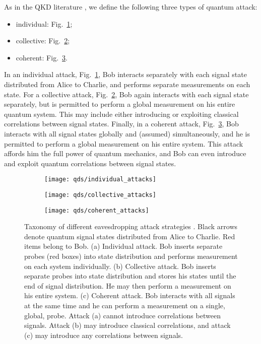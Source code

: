 As in the QKD literature \cite{Lutkenhaus2004}, we define the following three types of quantum attack: 
\begin{itemize}
\item individual: Fig.~\ref{fig:types_of_attack_individual};
\item collective: Fig.~\ref{fig:types_of_attack_collective};
\item coherent: Fig.~\ref{fig:types_of_attack_coherent}.
\end{itemize}
In an individual attack, Fig.~\ref{fig:types_of_attack_individual}, Bob interacts separately with each signal state distributed from Alice to Charlie, and performs separate measurements on each state. For a collective attack, Fig.~\ref{fig:types_of_attack_collective}, Bob again interacts with each signal state separately, but is permitted to perform a global measurement on his entire quantum system. This may include either introducing or exploiting classical correlations between signal states. Finally, in a coherent attack, Fig.~\ref{fig:types_of_attack_coherent}, Bob interacts with all signal states globally and (assumed) simultaneously, and he is permitted to perform a global measurement on his entire system. This attack affords him the full power of quantum mechanics, and Bob can even introduce and exploit quantum correlations between signal states.


\begin{figure}[htp]
\captionsetup{width=0.8\linewidth}
\centering
	\begin{subfigure}{\linewidth}
		\centering
			\caption{\label{fig:types_of_attack_individual}}
		\texttt{[image: qds/individual\_attacks]}
	\end{subfigure}
	\begin{subfigure}{\linewidth}
		\centering
		\caption{\label{fig:types_of_attack_collective}}	
		\texttt{[image: qds/collective\_attacks]}
	\end{subfigure}
	\begin{subfigure}{\linewidth}
		\centering
		\caption{\label{fig:types_of_attack_coherent}}	
		\texttt{[image: qds/coherent\_attacks]}
	\end{subfigure}
\caption{\label{fig:types_of_attack} Taxonomy of different eavesdropping attack strategies \cite{Lutkenhaus2004}. Black arrows denote quantum signal states distributed from Alice to Charlie. Red items belong to Bob. (a) Individual attack. Bob inserts separate probes (red boxes) into state distribution and performs measurement on each system individually. (b) Collective attack. Bob inserts separate probes into state distribution and stores his states until the end of signal distribution. He may then perform a measurement on his entire system. (c) Coherent attack. Bob interacts with all signals at the same time and he can perform a measurement on a single, global, probe. Attack (a) cannot introduce correlations between signals. Attack (b) may introduce classical correlations, and attack (c) may introduce any correlations between signals.}
\end{figure}

